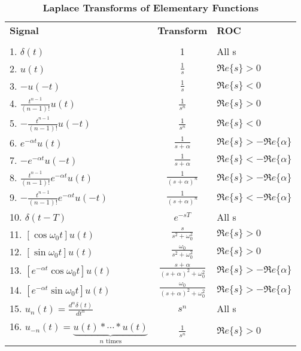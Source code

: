\documentclass[12pt]{article}
\newcommand{\R}{\mbox{$\Re e\{s\}$}}
\begin{document}
%
%

\begin{table}[htbp]
	\vspace*{-1.0in}
	\begin{center}
		
		\caption{\bf Laplace Transforms of Elementary
			Functions}
		\renewcommand{\arraystretch}{2.00}
		\begin{tabular}{l|c|l} \\
			{\bf Signal} &{\bf Transform} &{\bf ROC} \\ %
			&&\\
			\hline 1. $\delta(t)$ &1 & All
			s \\
			2. $u(t)$ &$\displaystyle\frac{1}{s}$ &$\R > 0$ \\
			3. $-u(-t)$ &$\displaystyle\frac{1}{s}$ &$\R < 0$ \\
			4. $\displaystyle\frac{t^{n-1}}{(n-1)!}u(t)$
			&$\displaystyle\frac{1}{s^{n}}$ &$\R > 0$ \\
			5. $-\displaystyle\frac{t^{n-1}}{(n-1)!}u(-t)$
			&$\displaystyle\frac{1}{s^{n}}$ &$\R < 0$ \\
			6. $e^{-\alpha t}u(t)$ &$\displaystyle\frac{1}{s + \alpha}$
			&$\R > -\Re e \{ \alpha\} $  \\
			7. $-e^{-\alpha t}u(-t)$ &$\displaystyle\frac{1}{s +
				\alpha}$ &$\R < -\Re e \{ \alpha\} $ \\
			8. $\displaystyle\frac{t^{n-1}}{(n-1)!}e^{-\alpha t}u(t)$
			&$\displaystyle\frac{1}{(s + \alpha)^{n}}$ &$\R > -\Re e \{ \alpha\} $ \\
			9. $\displaystyle-{\frac{t^{n-1}}{(n-1)!}e^{-\alpha t}u(-t)}$
			&$\displaystyle\frac{1}{(s + \alpha)^{n}}$ &$\R < -\Re e \{ \alpha\} $ \\
			
			10. $\delta(t-T)$ & $e^{-sT}$ &All s \\
			11. $[\cos
			\omega_{0}t]u(t)$ & $\displaystyle\frac{s}{s^{2}+
				\omega^{2}_{0}}$ &$\R > 0$ \\
			12. $[\sin \omega_{0}t]u(t)$ &
			$\displaystyle\frac{\omega_{0}}{s^{2}+ \omega^{2}_{0}}$ &$\R >
			0$ \\
			13. $[e^{-\alpha t}\cos \omega_{0}t]u(t)$
			&$\displaystyle\frac{s + \alpha}{(s+\alpha)^{2} +
				\omega^{2}_{0}}$ &$\R > -\Re e\{ \alpha\} $\\
			14. $[e^{-\alpha t}\sin
			\omega_{0}t]u(t)$ &$\displaystyle\frac{\omega_{0}}{(s +
				\alpha)^{2} + \omega^{2}_{0}}$ &$\R >-\Re e\{ \alpha\} $ \\
			15. $u_n(t)=\displaystyle\frac{d^{n}\delta(t)}{dt^{n}}$&$s^{n}$
			&All s \\
			16. $u_{-n}(t)=\underbrace{u(t)\ast \cdots \ast u(t)}_{n \text{ times}}$
			&$\displaystyle\frac{1}{s^{n}}$ &$\R > 0$ \\
		\end{tabular}
	\end{center}
\end{table}
\clearpage
\end{document}
